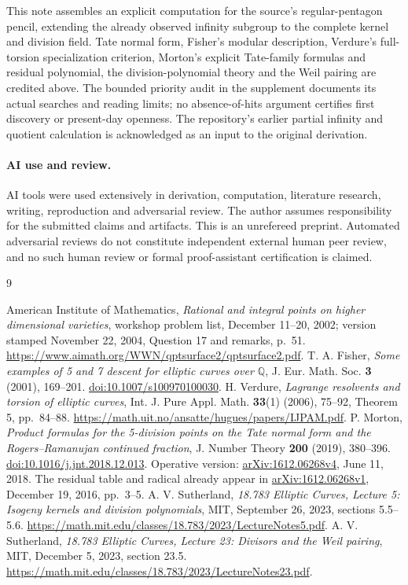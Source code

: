 \documentclass[11pt]{article}
\newcommand{\Q}{\mathbb Q}
\begin{document}
This note assembles an explicit computation for the source's
regular-pentagon pencil, extending the already observed infinity
subgroup to the complete kernel and division field. Tate normal form,
Fisher's modular description, Verdure's full-torsion specialization
criterion, Morton's explicit Tate-family formulas
and residual polynomial, the division-polynomial theory and the
Weil pairing are credited above. The bounded priority audit in the
supplement documents its actual searches and reading limits; no
absence-of-hits argument certifies first discovery or present-day
openness. The repository's earlier partial infinity and quotient
calculation is acknowledged as an input to the original derivation.

\paragraph{AI use and review.}
AI tools were used extensively in derivation, computation, literature
research, writing, reproduction and adversarial review. The author
assumes responsibility for the submitted claims and artifacts. This
is an unrefereed preprint. Automated adversarial reviews do not
constitute independent external human peer review, and no such human
review or formal proof-assistant certification is claimed.

\begin{thebibliography}{9}
\raggedright
{} American Institute of Mathematics,
\emph{Rational and integral points on higher dimensional varieties},
workshop problem list, December 11--20, 2002; version stamped
November 22, 2004, Question 17 and remarks, p.~51.
\url{https://www.aimath.org/WWN/qptsurface2/qptsurface2.pdf}.
 T. A. Fisher, \emph{Some examples of 5 and 7 descent for
elliptic curves over $\Q$}, J. Eur. Math. Soc. \textbf{3} (2001), 169--201.
\href{https://doi.org/10.1007/s100970100030}{doi:10.1007/s100970100030}.
 H. Verdure, \emph{Lagrange resolvents and torsion of
elliptic curves}, Int. J. Pure Appl. Math. \textbf{33}(1) (2006), 75--92,
Theorem 5, pp.~84--88.
\url{https://math.uit.no/ansatte/hugues/papers/IJPAM.pdf}.
 P. Morton, \emph{Product formulas for the 5-division
points on the Tate normal form and the Rogers--Ramanujan continued
fraction}, J. Number Theory \textbf{200} (2019), 380--396.
\href{https://doi.org/10.1016/j.jnt.2018.12.013}{doi:10.1016/j.jnt.2018.12.013}.
Operative version: \href{https://arxiv.org/abs/1612.06268v4}{arXiv:1612.06268v4},
June 11, 2018. The residual table and radical already appear in
\href{https://arxiv.org/abs/1612.06268v1}{arXiv:1612.06268v1},
December 19, 2016, pp.~3--5.
 A. V. Sutherland, \emph{18.783 Elliptic Curves,
Lecture 5: Isogeny kernels and division polynomials}, MIT, September 26, 2023,
sections 5.5--5.6.
\url{https://math.mit.edu/classes/18.783/2023/LectureNotes5.pdf}.
 A. V. Sutherland, \emph{18.783 Elliptic Curves,
Lecture 23: Divisors and the Weil pairing}, MIT, December 5, 2023, section 23.5.
\url{https://math.mit.edu/classes/18.783/2023/LectureNotes23.pdf}.
\end{thebibliography}
\end{document}
